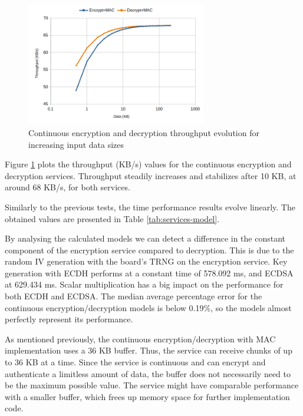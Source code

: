 \begin{figure}[h!]
	\centering
	\includegraphics[width=0.7\textwidth]{./Images/services-tput.png}
	\caption{Continuous encryption and decryption throughput evolution for increasing input data sizes}
	\label{fig:performance:services-tput}
\end{figure}
Figure \ref{fig:performance:services-tput} plots the throughput (KB/s) values for the continuous encryption and decryption services. Throughput steadily increases and stabilizes after 10 KB, at around 68 KB/s, for both services.

Similarly to the previous tests, the time performance results evolve linearly. The obtained values are presented in Table \ref{tab:services-model}.


By analysing the calculated models we can detect a difference in the constant component of the encryption service compared to decryption. This is due to the random IV generation with the board's TRNG on the encryption service.
Key generation with ECDH performs at a constant time of 578.092 ms, and ECDSA at 629.434 ms.
Scalar multiplication has a big impact on the performance for both ECDH and ECDSA.
The median average percentage error for the continuous encryption/decryption models is below 0.19\%, so the models almost perfectly represent its performance.%

As mentioned previously, the continuous encryption/decryption with MAC implementation uses a 36 KB buffer. Thus, the service can receive chunks of up to 36 KB at a time.
Since the service is continuous and can encrypt and authenticate a limitless amount of data, the buffer does not necessarily need to be the maximum possible value. The service might have comparable performance with a smaller buffer, which frees up memory space for further implementation code.


